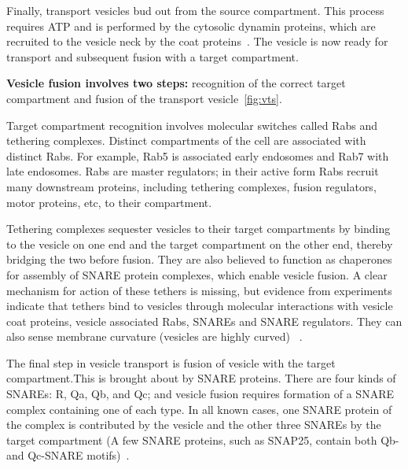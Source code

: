 Finally, transport vesicles bud out from the source compartment. This process requires ATP and is performed by the cytosolic dynamin proteins, which are recruited to the vesicle neck by the coat proteins~\cite{cocucci2014dynamin}.
%
The vesicle is now ready for transport and subsequent fusion with a target compartment.

\textbf{Vesicle fusion involves two steps:} recognition of the correct target compartment and fusion of the transport vesicle~\ref{fig:vts}.

Target compartment recognition involves molecular switches called Rabs and  tethering complexes. Distinct compartments of the cell are associated with distinct Rabs. For example, Rab5 is associated early endosomes and  Rab7 with late endosomes\cite{rink2005rab}.  Rabs are master regulators; in their active form Rabs recruit many downstream proteins, including tethering complexes, fusion regulators, motor proteins, etc, to their compartment. ~\cite{muller2018molecular}

Tethering complexes sequester vesicles to their target compartments by binding to the vesicle on one end and the target compartment on the other end, thereby bridging the two before fusion. They are also believed to function as chaperones for assembly of SNARE protein complexes, which enable vesicle fusion. 
A clear mechanism for action of these tethers is missing, but evidence from experiments indicate that tethers bind to vesicles through molecular interactions with vesicle coat proteins, vesicle associated Rabs, SNAREs and SNARE regulators. They can also sense membrane curvature (vesicles are highly curved) ~\cite{baker2016chaperoning}.

The final step in vesicle transport is fusion of vesicle with the target compartment.This is brought about by SNARE proteins. 
There are four kinds of SNAREs: R, Qa, Qb, and Qc; and vesicle fusion requires formation of a SNARE complex containing one of each type. In all known cases, one SNARE protein of the complex is contributed by the vesicle and the other three SNAREs by the target compartment (A few SNARE proteins, such as SNAP25, contain both Qb- and Qc-SNARE motifs)~\cite{yoon2018snare}.

